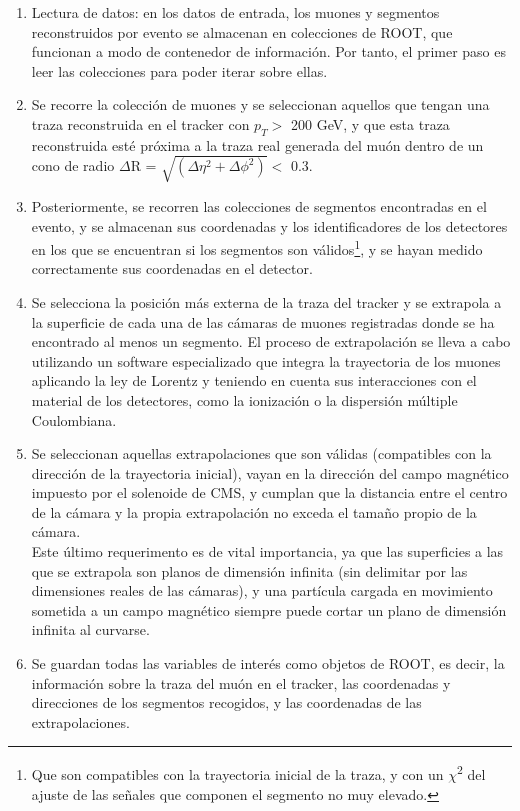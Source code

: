 \begin{enumerate}
\item Lectura de datos: en los datos de entrada, los muones y segmentos reconstruidos por evento se almacenan en colecciones de ROOT, que funcionan a modo de contenedor de informaci\'on. Por tanto, el primer paso es leer las colecciones para poder iterar sobre ellas. 

\item Se recorre la colecci\'on de muones y se seleccionan aquellos que tengan una traza reconstruida en el tracker con $p_{T} >$ 200 GeV, y que esta traza reconstruida est\'e pr\'oxima a la traza real generada del mu\'on dentro de un cono de radio $\Delta$R = $\sqrt{(\Delta\eta^{2}+\Delta\phi^{2})} <$  0.3.

\item Posteriormente, se recorren las colecciones de segmentos encontradas en el evento, y se almacenan sus coordenadas y los identificadores de los detectores en los que se encuentran si los segmentos son v\'alidos\footnote{Que son compatibles con la trayectoria inicial de la traza, y con un $\chi$\textsuperscript{2} del ajuste de las se\~nales que componen el segmento no muy elevado.}, y se hayan medido correctamente sus coordenadas en el detector.

\item Se selecciona la posici\'on m\'as externa de la traza del tracker y se extrapola a la superficie de cada una de las c\'amaras de muones registradas donde se ha encontrado al menos un segmento. El proceso de extrapolaci\'on se lleva a cabo utilizando un software especializado que integra la trayectoria de los muones aplicando la ley de Lorentz y teniendo en cuenta sus interacciones con el material de los detectores, como la ionizaci\'on o la dispersi\'on m\'ultiple Coulombiana.
\item Se seleccionan aquellas extrapolaciones que son v\'alidas (compatibles con la direcci\'on de la trayectoria inicial), vayan en la direcci\'on del campo magn\'etico impuesto por el solenoide de CMS, y cumplan que la distancia entre el centro de la c\'amara y la propia extrapolaci\'on no exceda el tama\~no propio de la c\'amara. \\
Este \'ultimo requerimento es de vital importancia, ya que las superficies a las que se extrapola son planos de dimensi\'on infinita (sin delimitar por las dimensiones reales de las c\'amaras), y una part\'icula cargada en movimiento sometida a un campo magn\'etico siempre puede cortar un plano de dimensi\'on infinita al curvarse.

\item Se guardan todas las variables de inter\'es como objetos de ROOT, es decir, la informaci\'on sobre la traza del mu\'on en el tracker, las coordenadas y direcciones de los segmentos recogidos, y las coordenadas de las extrapolaciones.
\end{enumerate}



